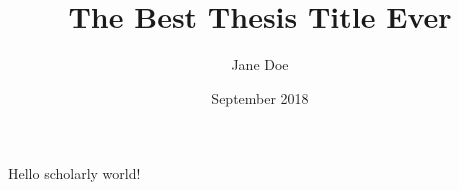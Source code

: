 \documentclass{article}
\title{The Best Thesis Title Ever}
\author{Jane Doe}
\date{September 2018}
\begin{document}
   \maketitle
   Hello scholarly world!\cite{MartinP2001}
   


\end{document}
